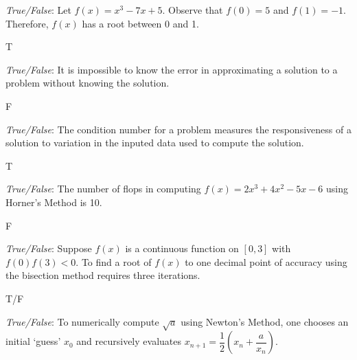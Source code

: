\documentclass[11pt,letterpaper]{article}
\begin{document}
\thispagestyle{title}


\quizsol \textit{True/False}: Let $f(x)= x^3 - 7x + 5$. Observe that $f(0)= 5$ and $f(1)= -1$. Therefore, $f(x)$ has a root between 0 and 1. \pspace

\sol T


\quizsol \textit{True/False}: It is impossible to know the error in approximating a solution to a problem without knowing the solution. \pspace

\sol F

\quizsol \textit{True/False}: The condition number for a problem measures the responsiveness of a solution to variation in the inputed data used to compute the solution. \pspace

\sol T


\quizsol \textit{True/False}: The number of flops in computing $f(x)= 2x^3 + 4x^2 - 5x - 6$ using Horner's Method is 10. \pspace

\sol F


\quizsol \textit{True/False}: Suppose $f(x)$ is a continuous function on $[0, 3]$ with $f(0)f(3) < 0$. To find a root of $f(x)$ to one decimal point of accuracy using the bisection method requires three iterations. \pspace

\sol T/F



\quizsol \textit{True/False}: To numerically compute $\sqrt{a}$ using Newton's Method, one chooses an initial `guess' $x_0$ and recursively evaluates $x_{n+1}= \dfrac{1}{2} \left( x_n + \dfrac{a}{x_n} \right)$.
\end{document}
